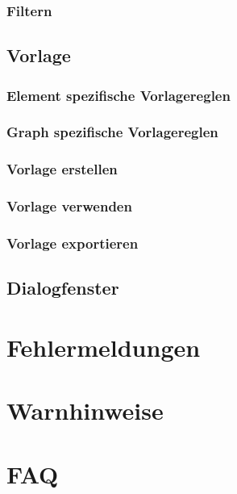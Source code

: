\documentclass[enabledeprecatedfontcommands,fontsize=11pt,paper=a4,twoside]{scrartcl}
\begin{document}
		\subsubsection{Filtern}
	\subsection{Vorlage} \label{template}
		\subsubsection{Element spezifische Vorlagereglen}
		\subsubsection{Graph spezifische Vorlagereglen}
		\subsubsection{Vorlage erstellen}
		\subsubsection{Vorlage verwenden}
		\subsubsection{Vorlage exportieren}
	\subsection{Dialogfenster} \label{dialog}
	\newpage
	\section{Fehlermeldungen} \label{fehlermeldungen}
	
	
\section{Warnhinweise} \label{sec:warnhinweise}
	
	
	
	
\section{FAQ}
\newpage
\end{document}
